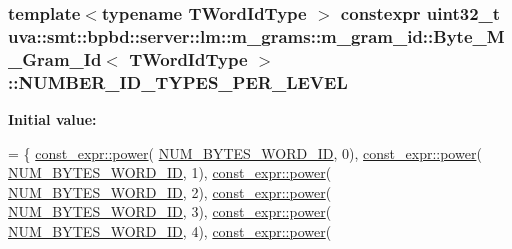 \subsubsection[{N\+U\+M\+B\+E\+R\+\_\+\+I\+D\+\_\+\+T\+Y\+P\+E\+S\+\_\+\+P\+E\+R\+\_\+\+L\+E\+V\+E\+L}]{\setlength{\rightskip}{0pt plus 5cm}template$<$typename T\+Word\+Id\+Type $>$ constexpr uint32\+\_\+t {\bf uva\+::smt\+::bpbd\+::server\+::lm\+::m\+\_\+grams\+::m\+\_\+gram\+\_\+id\+::\+Byte\+\_\+\+M\+\_\+\+Gram\+\_\+\+Id}$<$ T\+Word\+Id\+Type $>$\+::N\+U\+M\+B\+E\+R\+\_\+\+I\+D\+\_\+\+T\+Y\+P\+E\+S\+\_\+\+P\+E\+R\+\_\+\+L\+E\+V\+E\+L\hspace{0.3cm}{\ttfamily [static]}}\label{classuva_1_1smt_1_1bpbd_1_1server_1_1lm_1_1m__grams_1_1m__gram__id_1_1_byte___m___gram___id_ade76de6674a38cc51d7ff5b5c8c8b9a0}
{\bfseries Initial value\+:}
\begin{DoxyCode}
= \{
                                    \hyperlink{namespaceuva_1_1utils_1_1math_1_1const__expr_af88edac03f2feda3027da86d576d5b46}{const\_expr::power}(
      \hyperlink{classuva_1_1smt_1_1bpbd_1_1server_1_1lm_1_1m__grams_1_1m__gram__id_1_1_byte___m___gram___id_abfb2441a9e2b433ef183d2f979979122}{NUM\_BYTES\_WORD\_ID}, 0),
                                    \hyperlink{namespaceuva_1_1utils_1_1math_1_1const__expr_af88edac03f2feda3027da86d576d5b46}{const\_expr::power}(
      \hyperlink{classuva_1_1smt_1_1bpbd_1_1server_1_1lm_1_1m__grams_1_1m__gram__id_1_1_byte___m___gram___id_abfb2441a9e2b433ef183d2f979979122}{NUM\_BYTES\_WORD\_ID}, 1),
                                    \hyperlink{namespaceuva_1_1utils_1_1math_1_1const__expr_af88edac03f2feda3027da86d576d5b46}{const\_expr::power}(
      \hyperlink{classuva_1_1smt_1_1bpbd_1_1server_1_1lm_1_1m__grams_1_1m__gram__id_1_1_byte___m___gram___id_abfb2441a9e2b433ef183d2f979979122}{NUM\_BYTES\_WORD\_ID}, 2),
                                    \hyperlink{namespaceuva_1_1utils_1_1math_1_1const__expr_af88edac03f2feda3027da86d576d5b46}{const\_expr::power}(
      \hyperlink{classuva_1_1smt_1_1bpbd_1_1server_1_1lm_1_1m__grams_1_1m__gram__id_1_1_byte___m___gram___id_abfb2441a9e2b433ef183d2f979979122}{NUM\_BYTES\_WORD\_ID}, 3),
                                    \hyperlink{namespaceuva_1_1utils_1_1math_1_1const__expr_af88edac03f2feda3027da86d576d5b46}{const\_expr::power}(
      \hyperlink{classuva_1_1smt_1_1bpbd_1_1server_1_1lm_1_1m__grams_1_1m__gram__id_1_1_byte___m___gram___id_abfb2441a9e2b433ef183d2f979979122}{NUM\_BYTES\_WORD\_ID}, 4),
                                    \hyperlink{namespaceuva_1_1utils_1_1math_1_1const__expr_af88edac03f2feda3027da86d576d5b46}{const\_expr::power}(

\end{DoxyCode}
